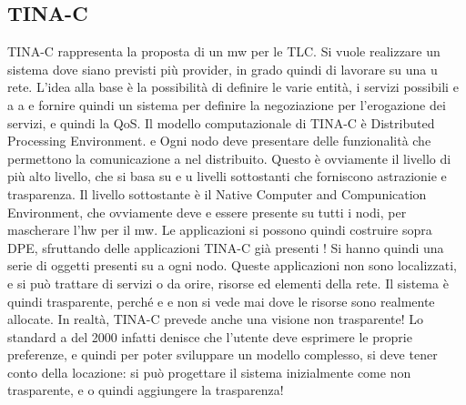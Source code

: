 \documentclass[a4paper,12pt]{article}
\begin{document}
\subsection{TINA-C}
TINA-C rappresenta la proposta di un mw per le TLC. Si vuole realizzare un
sistema dove siano previsti più provider, in grado quindi di lavorare su una
u
rete. L'idea alla base è la possibilità di definire le varie entità, i servizi possibili
e
a
a
e fornire quindi un sistema per definire la negoziazione per l'erogazione dei
servizi, e quindi la QoS.
Il modello computazionale di TINA-C è Distributed Processing Environment.
e
Ogni nodo deve presentare delle funzionalità che permettono la comunicazione
a
nel distribuito. Questo è ovviamente il livello di più alto livello, che si basa su
e
u
livelli sottostanti che forniscono astrazionie e trasparenza. Il livello sottostante
è il Native Computer and Compunication Environment, che ovviamente deve
e
essere presente su tutti i nodi, per mascherare l'hw per il mw.
Le applicazioni si possono quindi costruire sopra DPE, sfruttando delle applicazioni TINA-C già presenti ! Si hanno
quindi una serie di oggetti presenti su
a
ogni nodo. Queste applicazioni non sono localizzati, e si può trattare di servizi
o
da orire, risorse ed elementi della rete. Il sistema è quindi trasparente, perché
e
e
non si vede mai dove le risorse sono realmente allocate.
In realtà, TINA-C prevede anche una visione non trasparente! Lo standard
a
del 2000 infatti denisce che l'utente deve esprimere le proprie preferenze, e
quindi per poter sviluppare un modello complesso, si deve tener conto della
locazione: si può progettare il sistema inizialmente come non trasparente, e
o
quindi aggiungere la trasparenza!
\end{document}
